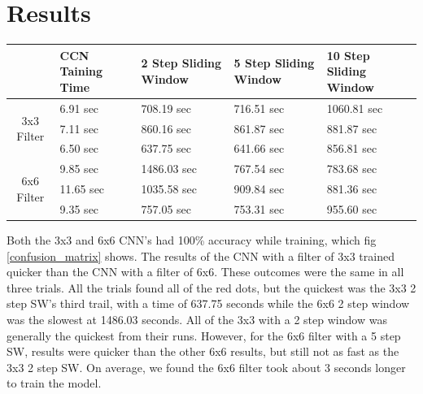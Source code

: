\documentclass[a4paper,10pt]{article}
\begin{document}

\section{Results}




\begin{center}
	\begin{tabular}{ |c|p{1.5cm}|p{2.25cm}|p{2.25cm}|p{2.25cm}| } 
		
		\hline
		 & CCN Taining Time & 2 Step Sliding Window & 5 Step Sliding Window & 10 Step Sliding Window \\
		\hline
		\multirow{3}{4em}{3x3 Filter} & 6.91 sec & 708.19 sec & 716.51 sec & 1060.81 sec \\ 
		
		& 7.11 sec & 860.16 sec & 861.87 sec & 881.87 sec  \\ 
		& 6.50 sec & 637.75 sec & 641.66 sec & 856.81 sec \\ 
		\hline
		\multirow{3}{4em}{6x6 Filter} & 9.85 sec & 1486.03 sec & 767.54 sec & 783.68 sec \\ 
		& 11.65 sec & 1035.58 sec & 909.84 sec & 881.36 sec \\ 
		& 9.35 sec & 757.05 sec & 753.31 sec & 955.60 sec \\ 
		\hline
	\end{tabular}
\end{center}

Both the 3x3 and 6x6 CNN's had 100\% accuracy while training, which fig \ref{confusion_matrix} shows. The results of the CNN with a filter of 3x3 trained quicker than the CNN with a filter of 6x6. These outcomes were the same in all three trials. All the trials found all of the red dots, but the quickest was the 3x3 2 step SW's third trail, with a time of 637.75 seconds while the 6x6 2 step window was the slowest at 1486.03 seconds. All of the 3x3 with a 2 step window was generally the quickest from their runs. However, for the 6x6 filter with a 5 step SW, results were quicker than the other 6x6 results, but still not as fast as the 3x3 2 step SW. On average, we found the 6x6 filter took about 3 seconds longer to train the model.
\end{document}
